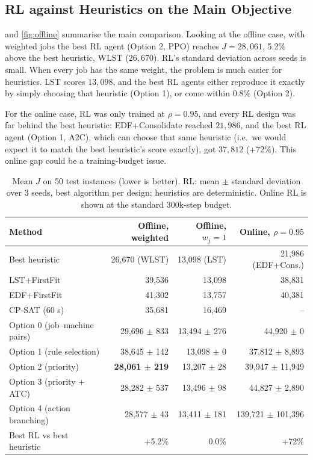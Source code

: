 \documentclass[12pt]{article}
\begin{document}
\subsection{RL against Heuristics on the Main Objective}\label{sec:res-main}
 and \cref{fig:offline} summarise the main comparison. Looking at the offline case, with weighted jobs the best RL agent (Option 2, PPO) reaches $J = 28{,}061$, 5.2\% above the best heuristic, WLST ($26{,}670$). RL's standard deviation across seeds is small. When every job has the same weight, the problem is much easier for heuristics. LST scores $13{,}098$, and the best RL agents either reproduce it exactly by simply choosing that heuristic (Option 1), or come within 0.8\% (Option 2).

For the online case, RL was only trained at $\rho = 0.95$, and every RL design was far behind the best heuristic: EDF+Consolidate reached $21{,}986$, and the best RL agent (Option 1, A2C), which can choose that same heuristic (i.e.\ we would expect it to match the best heuristic's score exactly), got $37{,}812$ (+72\%). This online gap could be a training-budget issue.

\begin{table}[htbp]
\centering
\caption{Mean $J$ on 50 test instances (lower is better). RL: mean $\pm$ standard deviation over 3 seeds, best algorithm per design; heuristics are deterministic. Online RL is shown at the standard 300k-step budget.}
\label{tab:main}
\begin{tabular}{lrrr}
\toprule
Method & Offline, weighted & Offline, $w_j = 1$ & Online, $\rho = 0.95$ \\
\midrule
Best heuristic & 26,670 (WLST) & 13,098 (LST) & 21,986 (EDF+Cons.) \\
LST+FirstFit & 39,536 & 13,098 & 38,831 \\
EDF+FirstFit & 41,302 & 13,757 & 40,381 \\
CP-SAT (60 s) & 35,681 & 16,469 & -- \\
\midrule
Option 0 (job--machine pairs) & 29,696 $\pm$ 833 & 13,494 $\pm$ 276 & 44,920 $\pm$ 0 \\
Option 1 (rule selection) & 38,645 $\pm$ 142 & 13,098 $\pm$ 0 & 37,812 $\pm$ 8,893 \\
Option 2 (priority) & \textbf{28,061 $\pm$ 219} & 13,207 $\pm$ 28 & 39,947 $\pm$ 11,949 \\
Option 3 (priority + ATC) & 28,282 $\pm$ 537 & 13,496 $\pm$ 98 & 44,827 $\pm$ 2,890 \\
Option 4 (action branching) & 28,577 $\pm$ 43 & 13,411 $\pm$ 181 & 139,721 $\pm$ 101,396 \\
\midrule
Best RL vs best heuristic & +5.2\% & 0.0\% & +72\% \\
\bottomrule
\end{tabular}
\end{table}
\end{document}
